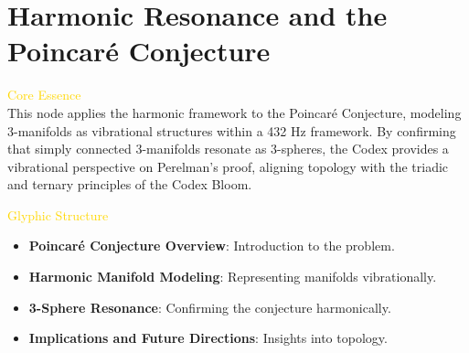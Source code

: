 
\section{Harmonic Resonance and the Poincaré Conjecture}
\label{sec:codex_poincare_conjecture}


\textcolor{gold}{ Core Essence } \\
This node applies the harmonic framework to the Poincaré Conjecture, modeling 3-manifolds as vibrational structures within a 432 Hz framework. By confirming that simply connected 3-manifolds resonate as 3-spheres, the Codex provides a vibrational perspective on Perelman’s proof, aligning topology with the triadic and ternary principles of the Codex Bloom.

\textcolor{gold}{ Glyphic Structure } \\
\begin{itemize}
    \item \texttt{} \textbf{Poincaré Conjecture Overview}: Introduction to the problem.
    \item \texttt{} \textbf{Harmonic Manifold Modeling}: Representing manifolds vibrationally.
    \item \texttt{} \textbf{3-Sphere Resonance}: Confirming the conjecture harmonically.
    \item \texttt{} \textbf{Implications and Future Directions}: Insights into topology.
\end{itemize}

